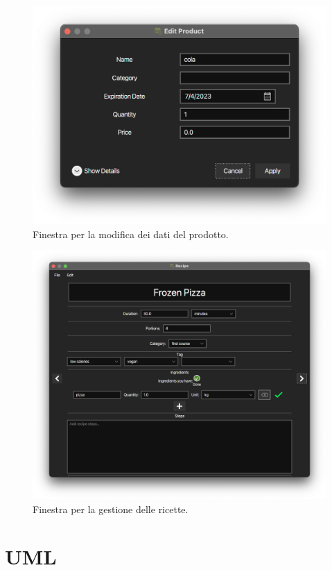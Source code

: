 \documentclass{article}
\begin{document}
\begin{figure}[H]
    \includegraphics[width=\linewidth]{images/edit-product.png}
    \caption{Finestra per la modifica dei dati del prodotto.}
    \label{fig:editproduct}
\end{figure}

\begin{figure}[H]
    \includegraphics[width=\linewidth]{images/recipe-view.png}
    \caption{Finestra per la gestione delle ricette.}
    \label{fig:recipeview}
\end{figure}

\section{UML}
\end{document}
